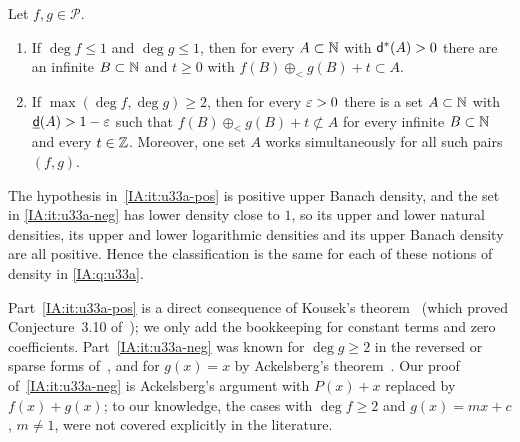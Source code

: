 \begin{theorem}\label{IA:thm:u33a}
Let $f,g\in\mathcal P$.
\begin{enumerate}[label=\textup{(\alph*)}]
\item\label{IA:it:u33a-pos} If $\deg f\le1$ and $\deg g\le1$, then for every $A\subset\mathbb{N}$ with
$\mathsf{d}^*(A)>0$ there are an infinite $B\subset\mathbb{N}$ and $t\ge0$ with $f(B)\oplus_<g(B)+t\subset A$.
\item\label{IA:it:u33a-neg} If $\max(\deg f,\deg g)\ge2$, then for every $\varepsilon>0$ there is a set
$A\subset\mathbb{N}$ with $\underline{\mathsf{d}}(A)>1-\varepsilon$ such that $f(B)\oplus_<g(B)+t\not\subset A$ for every
infinite $B\subset\mathbb{N}$ and every $t\in\mathbb{Z}$. Moreover, one set $A$ works simultaneously for all such
pairs $(f,g)$.
\end{enumerate}
\end{theorem}

The hypothesis in~\ref{IA:it:u33a-pos} is positive upper Banach density, and the set in
\ref{IA:it:u33a-neg} has lower density close to $1$, so its upper and lower natural densities, its
upper and lower logarithmic densities and its upper Banach density are all positive. Hence the classification
is the same for each of these notions of density in \cref{IA:q:u33a}.

\begin{remark}[Attribution]\label{IA:rem:u33a-credit}
Part~\ref{IA:it:u33a-pos} is a direct consequence of Kousek's theorem~\cite[Theorem~1.2]{kousek2025asymmetric}
(which proved Conjecture~3.10 of~\cite{kra2023problems}); we only add the bookkeeping for constant
terms and zero coefficients. Part~\ref{IA:it:u33a-neg} was known for $\deg g\ge2$ in the reversed or
sparse forms of~\cite[Example~3.14]{kra2023problems}, and for $g(x)=x$ by Ackelsberg's
theorem~\cite[Theorem~1.5]{ackelsberg2024counterexamples}. Our proof of~\ref{IA:it:u33a-neg} is
Ackelsberg's argument with $P(x)+x$ replaced by $f(x)+g(x)$; to our knowledge, the cases with
$\deg f\ge2$ and $g(x)=mx+c$, $m\ne1$, were not covered explicitly in the literature.
\end{remark}

